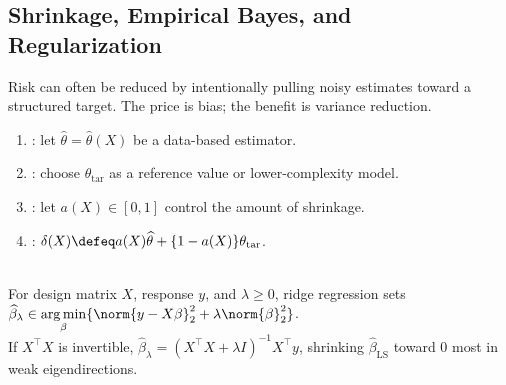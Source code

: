 \subsection{Shrinkage, Empirical Bayes, and Regularization}

Risk can often be reduced by intentionally pulling noisy estimates toward a structured target.  The price is bias; the benefit is variance reduction.

\begin{definition} \label{def:shrinkage-estimator} 
\begin{enumerate}[label=(\roman*)]
\setlength{\itemsep}{0pt}
\item {}: let $\widehat{\theta}=\widehat{\theta}(X)$ be a data-based estimator.
\item {}: choose $\theta_{\mathrm{tar}}$ as a reference value or lower-complexity model.
\item {}: let $a(X)\in[0,1]$ control the amount of shrinkage.
\item {}: $\delta(X)\defeq a(X)\widehat{\theta}+\{1-a(X)\}\theta_{\mathrm{tar}}$.
\end{enumerate}
\end{definition}

\begin{example} \label{ex:ridge-as-shrinkage} \\
For design matrix $X$, response $y$, and $\lambda\geq0$, ridge regression sets $\widehat{\beta}_\lambda\in\operatorname*{arg\,min}\limits_\beta\{\norm{y-X\beta}_2^2+\lambda\norm{\beta}_2^2\}$.\\
If $X^\top X$ is invertible, $\widehat{\beta}_\lambda=(X^\top X+\lambda I)^{-1}X^\top y$, shrinking $\widehat{\beta}_{\mathrm{LS}}$ toward $0$ most in weak eigendirections.
\end{example}

